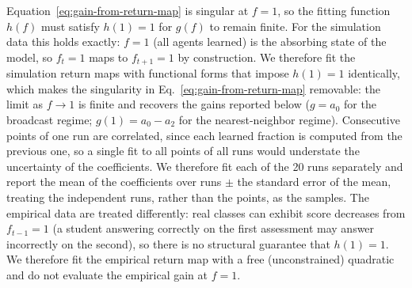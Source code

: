 \documentclass[a4paper,fleqn]{cas-sc}
\begin{document}
    Equation~\eqref{eq:gain-from-return-map} is singular at $f=1$, so the fitting function $h(f)$ must satisfy $h(1)=1$ for $g(f)$ to remain finite. For the simulation data this holds exactly: $f=1$ (all agents learned) is the absorbing state of the model, so $f_t=1$ maps to $f_{t+1}=1$ by construction. We therefore fit the simulation return maps with functional forms that impose $h(1)=1$ identically, which makes the singularity in Eq.~\eqref{eq:gain-from-return-map} removable: the limit as $f\to1$ is finite and recovers the gains reported below ($g=a_0$ for the broadcast regime; $g(1)=a_0-a_2$ for the nearest-neighbor regime). Consecutive points of one run are correlated, since each learned fraction is computed from the previous one, so a single fit to all points of all runs would understate the uncertainty of the coefficients. We therefore fit each of the 20 runs separately and report the mean of the coefficients over runs $\pm$ the standard error of the mean, treating the independent runs, rather than the points, as the samples. The empirical data are treated differently: real classes can exhibit score decreases from $f_{t-1}=1$ (a student answering correctly on the first assessment may answer incorrectly on the second), so there is no structural guarantee that $h(1)=1$. We therefore fit the empirical return map with a free (unconstrained) quadratic and do not evaluate the empirical gain at $f=1$.
\end{document}
